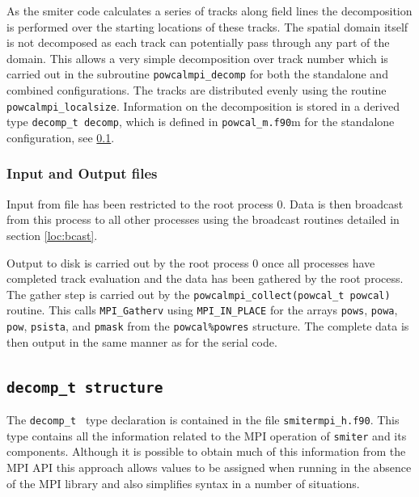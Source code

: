 As the smiter code calculates a series of tracks along field lines the decomposition is performed over the starting locations of these tracks. The spatial domain itself is not decomposed as each track can potentially pass through any part of the domain. This allows a very simple decomposition over track number which is carried out in the subroutine {\tt powcalmpi\_decomp} for both the standalone and combined configurations. The tracks are distributed evenly using the routine {\tt powcalmpi\_localsize}. Information on the decomposition is stored in a derived type {\tt decomp\_t decomp}, which is defined in {\tt powcal\_m.f90}m for the standalone configuration, see \ref{loc:decomp_t}.

\subsubsection{Input and Output files}
Input from file has been restricted to the root process 0. Data is then broadcast from this process to all other processes using the broadcast routines detailed in section \ref{loc:bcast}.

Output to disk is carried out by the root process 0 once all processes have completed track evaluation and the data has been gathered by the root process. The gather step is carried out by the {\tt powcalmpi\_collect(powcal\_t powcal)} routine. This calls {\tt MPI\_Gatherv} using {\tt MPI\_IN\_PLACE} for the arrays {\tt pows}, {\tt powa}, {\tt pow}, {\tt psista}, and {\tt pmask} from the {\tt powcal\%powres} structure. The complete data is then output in the same manner as for the serial code.

\subsection{{\tt decomp\_t structure}}
\label{loc:decomp_t}
The {\tt decomp\_t } type declaration is contained in the file {\tt smitermpi\_h.f90}. This type contains all the information related to the MPI operation of {\tt smiter} and its components. Although it is possible to obtain much of this information from the MPI API this approach allows values to be assigned when running in the absence of the MPI library and also simplifies syntax in a number of situations.

